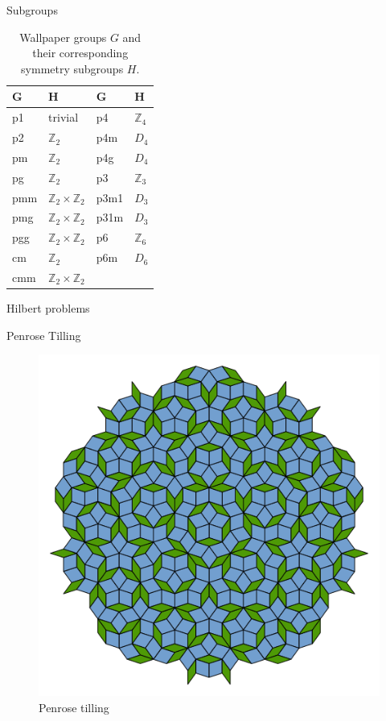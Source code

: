 \documentclass{beamer}
\begin{document}
\begin{frame}{Subgroups}
  \begin{table}
    \centering
    \begin{tabular}{@{} ll @{\qquad} ll @{}}
      \toprule
      \textbf{G} & \textbf{H} & \textbf{G} & \textbf{H} \\
      \midrule
      p1   & trivial                          & p4    & $\mathbb{Z}_4$              \\
      p2   & $\mathbb{Z}_2$                   & p4m   & $D_4$                       \\
      pm   & $\mathbb{Z}_2$                   & p4g   & $D_4$                       \\
      pg   & $\mathbb{Z}_2$                   & p3    & $\mathbb{Z}_3$              \\
      pmm  & $\mathbb{Z}_2\times\mathbb{Z}_2$ & p3m1  & $D_3$                       \\
      pmg  & $\mathbb{Z}_2\times\mathbb{Z}_2$ & p31m  & $D_3$                       \\
      pgg  & $\mathbb{Z}_2\times\mathbb{Z}_2$ & p6    & $\mathbb{Z}_6$              \\
      cm   & $\mathbb{Z}_2$                   & p6m   & $D_6$                       \\
      cmm  & $\mathbb{Z}_2\times\mathbb{Z}_2$ &       &                             \\
      \bottomrule
    \end{tabular}
    \caption{Wallpaper groups \(G\) and their corresponding symmetry subgroups \(H\).} \cite{}
  \end{table}
\end{frame}


\begin{frame}{Hilbert problems}
    
\end{frame}

\begin{frame}{Penrose Tilling}
    \begin{figure}
        \centering
        \includegraphics[width=0.5\linewidth]{images/Penrose_Tiling_(Rhombi).svg.png}
        \caption{Penrose tilling}
        \label{fig:penrose-rhombi}
    \end{figure}
\end{frame}
\end{document}
